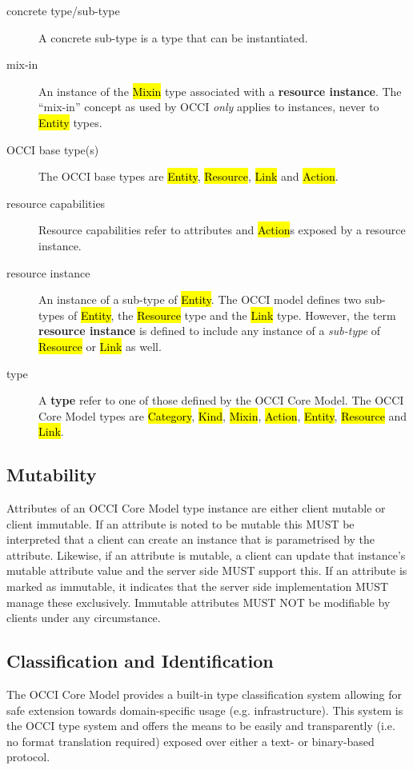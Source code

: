 \documentclass[10pt,a4paper]{article}
\begin{document}
\begin{description}
  \item[concrete type/sub-type] A concrete sub-type is a type that can
    be instantiated.
  \item[mix-in] An instance of the \hl{Mixin} type associated with a
    {\bf resource instance}. The ``mix-in'' concept as used by OCCI
    {\em only} applies to instances, never to \hl{Entity} types.
  \item[OCCI base type(s)] The OCCI base types are \hl{Entity},
    \hl{Resource}, \hl{Link} and \hl{Action}.
  \item[resource capabilities] Resource capabilities refer to
    attributes and \hl{Action}s exposed by a resource instance.
  \item[resource instance] An instance of a sub-type of
    \hl{Entity}. The OCCI model defines two sub-types of \hl{Entity},
    the \hl{Resource} type and the \hl{Link} type.  However, the term
    {\bf resource instance} is defined to include any instance of a
    {\em sub-type} of \hl{Resource} or \hl{Link} as well.
  \item[type] A {\bf type} refer to one of those defined by the OCCI
    Core Model.  The OCCI Core Model types are \hl{Category},
    \hl{Kind}, \hl{Mixin}, \hl{Action}, \hl{Entity}, \hl{Resource} and
    \hl{Link}.
\end{description}

\subsection{Mutability}
Attributes of an OCCI Core Model type instance are either client
mutable or client immutable. If an attribute is noted to be mutable
this MUST be interpreted that a client can create an instance that is
parametrised by the attribute. Likewise, if an attribute is mutable, a
client can update that instance's mutable attribute value and the
server side MUST support this. If an attribute is marked as immutable,
it indicates that the server side implementation MUST manage these
exclusively. Immutable attributes MUST NOT be modifiable by clients
under any circumstance.

\subsection{Classification and Identification}
\label{sec:classification}
The OCCI Core Model provides a built-in type classification system
allowing for safe extension towards domain-specific usage
(e.g. infrastructure). This system is the OCCI type system and offers
the means to be easily and transparently (i.e. no format translation
required) exposed over either a text- or binary-based protocol.
\end{document}
